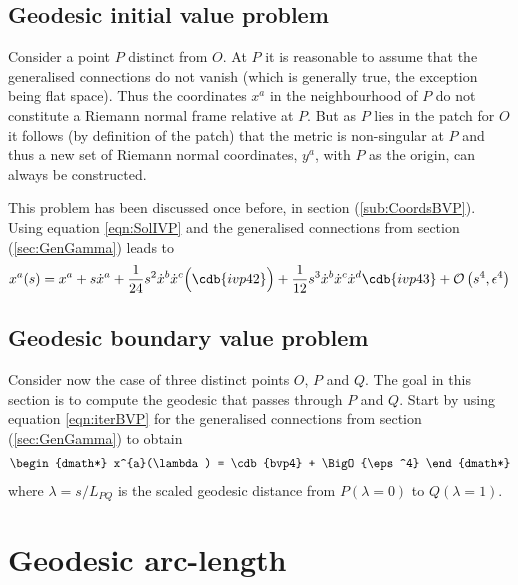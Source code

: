 \documentclass[a4paper,12pt]{article}
\numberwithin{equation}{section}
\begin{document}
\subsection{Geodesic initial value problem}\label{sec:GeodesicIVP}

Consider a point $P$ distinct from $O$. At $P$ it is reasonable to assume that the
generalised connections do not vanish (which is generally true, the exception being flat
space). Thus the coordinates $x^a$ in the neighbourhood of $P$ do not constitute a Riemann
normal frame relative at $P$. But as $P$ lies in the patch for $O$ it follows (by definition
of the patch) that the metric is non-singular at $P$ and thus a new set of Riemann normal
coordinates, $y^a$, with $P$ as the origin, can always be constructed.

This problem has been discussed once before, in section (\ref{sub:CoordsBVP}). Using equation
\eqref{eqn:SolIVP} and the generalised connections from section (\ref{sec:GenGamma}) leads to
%
\begin{dmath*}x^{a}(s)
   = x^{a}
   + s \dotx^{a}
   + \frac{1}{24} s^2 {\Dot x}^b {\Dot x}^c \Bigl(\cdb{ivp42}\Bigr)
   + \frac{1}{12} s^3 {\Dot x}^b {\Dot x}^c {\Dot x}^d \cdb{ivp43}
   + \BigO{s^4,\eps^4}\end{dmath*}
%
\subsection{Geodesic boundary value problem}\label{sec:GeodesicBVP}

Consider now the case of three distinct points $O$, $P$ and $Q$. The goal in this section is
to compute the geodesic that passes through $P$ and $Q$. Start by using equation
\eqref{eqn:iterBVP} for the generalised connections from section (\ref{sec:GenGamma}) to
obtain
%
\begin{dgroup*}[compact,spread={3pt}]
\begin{dmath*} x^{a}(\lambda) = \cdb{bvp4} + \BigO{\eps^4} \end{dmath*}
\end{dgroup*}
where $\lambda=s/L_{PQ}$ is the scaled geodesic distance from $P(\lambda=0)$ to
$Q(\lambda=1)$.

\section{Geodesic arc-length}\label{sec:ArcLength}
\end{document}
